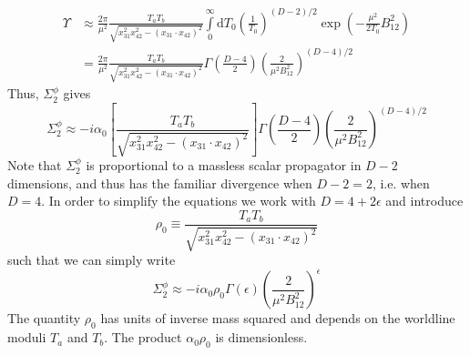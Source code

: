 \begin{align}
	\Upsilon &\approx \frac{2 \pi}{\mu^{2}} \frac{T_{a} T_{b}}{\sqrt{x_{31}^{2} x_{42}^{2} - (x_{31} \cdot x_{42})^{2}}} \int\limits_{0}^{\infty} \mathrm{d}T_{0} \left( \frac{1}{T_{0}} \right)^{(D - 2)/2} \exp{\left( -\frac{\mu^{2}}{2 T_{0}} B_{12}^{2} \right)} \nonumber \\
	&= \frac{2 \pi}{\mu^{2}} \frac{T_{a} T_{b}}{\sqrt{x_{31}^{2} x_{42}^{2} - (x_{31} \cdot x_{42})^{2}}} \Gamma\left( \frac{D - 4}{2} \right) \left( \frac{2}{\mu^{2} B_{12}^{2}} \right)^{(D - 4)/2} \label{upsi2}
\end{align}
Thus, $\Sigma_{2}^{\phi}$ gives
\begin{equation}
	\Sigma_{2}^{\phi} \approx -i\alpha_{0} \left[ \frac{T_{a} T_{b}}{\sqrt{x_{31}^{2} x_{42}^{2} - (x_{31} \cdot x_{42})^{2}}} \right] \Gamma\left( \frac{D - 4}{2} \right) \left( \frac{2}{\mu^{2} B_{12}^{2}} \right)^{(D - 4)/2} \label{Sig2Phi2}
\end{equation}
Note that $\Sigma_{2}^{\phi}$ is proportional to a massless scalar propagator in $D - 2$ dimensions, and thus has the familiar divergence when $D - 2 = 2$, i.e. when $D = 4$. In order to simplify the equations we work with $D = 4 + 2 \epsilon$ and introduce
\begin{equation}
	\rho_{0} \equiv \frac{T_{a} T_{b}}{\sqrt{x_{31}^{2} x_{42}^{2} - (x_{31} \cdot x_{42})^{2}}} \label{rho0Def}
\end{equation}
such that we can simply write
\begin{equation}
	\Sigma_{2}^{\phi} \approx -i\alpha_{0} \rho_{0} \Gamma(\epsilon) \left( \frac{2}{\mu^{2} B_{12}^{2}} \right)^{\epsilon} \label{Sigmaphi2}
\end{equation}
The quantity $\rho_{0}$ has units of inverse mass squared and depends on the worldline moduli $T_{a}$ and $T_{b}$. The product $\alpha_{0} \rho_{0}$ is dimensionless.
